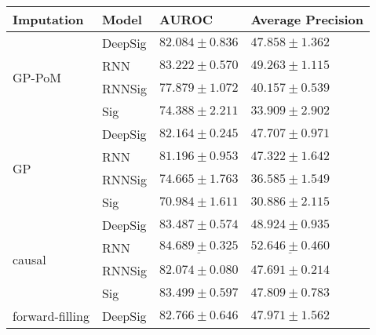 \begin{tabular}{llll}
\toprule
Imputation                       & Model   &                                         AUROC &                              Average Precision \\
\midrule
\multirow{4}{*}{GP-PoM}          & DeepSig &                           $ 82.084 \pm 0.836 $ &                           $ 47.858 \pm 1.362 $ \\
                                 & RNN     &                           $ 83.222 \pm 0.570 $ &                           $ 49.263 \pm 1.115 $ \\
                                 & RNNSig  &                           $ 77.879 \pm 1.072 $ &                           $ 40.157 \pm 0.539 $ \\
                                 & Sig     &                           $ 74.388 \pm 2.211 $ &                           $ 33.909 \pm 2.902 $ \\
\midrule
\multirow{4}{*}{GP}              & DeepSig &                           $ 82.164 \pm 0.245 $ &                           $ 47.707 \pm 0.971 $ \\
                                 & RNN     &                           $ 81.196 \pm 0.953 $ &                           $ 47.322 \pm 1.642 $ \\
                                 & RNNSig  &                           $ 74.665 \pm 1.763 $ &                           $ 36.585 \pm 1.549 $ \\
                                 & Sig     &                           $ 70.984 \pm 1.611 $ &                           $ 30.886 \pm 2.115 $ \\
\midrule
\multirow{4}{*}{causal}          & DeepSig &                           $ 83.487 \pm 0.574 $ &                           $ 48.924 \pm 0.935 $ \\
                                 & RNN     &            $  \underline{ 84.689 \pm 0.325 } $ &  $  \mathbf{ \underline{ 52.646 \pm 0.460 }} $ \\
                                 & RNNSig  &                           $ 82.074 \pm 0.080 $ &                           $ 47.691 \pm 0.214 $ \\
                                 & Sig     &                           $ 83.499 \pm 0.597 $ &                           $ 47.809 \pm 0.783 $ \\
\midrule
\multirow{4}{*}{forward-filling} & DeepSig &                           $ 82.766 \pm 0.646 $ &                           $ 47.971 \pm 1.562 $ \\

\end{tabular}
